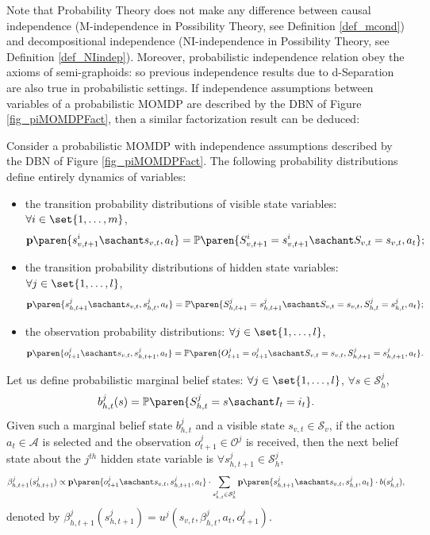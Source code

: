 Note that Probability Theory does not make any difference between 
causal independence (M-independence in Possibility Theory, see Definition \ref{def_mcond}) 
and decompositional independence (NI-independence in Possibility Theory, see Definition \ref{def_NIindep}).
Moreover, probabilistic independence relation obey the axioms of semi-graphoids:
so previous independence results due to d-Separation are also true in probabilistic settings. 
If independence assumptions between variables of a probabilistic MOMDP \cite{OngShaoHsuWee-IJRR10,AraThoBufCha-ICTAI10} are described 
by the DBN of Figure \ref{fig_piMOMDPFact},
then a similar factorization result can be deduced:
\begin{theorem}
\label{thm_factoredPROBbelief}
Consider a probabilistic MOMDP with independence assumptions described by the DBN of Figure \ref{fig_piMOMDPFact}.
The following probability distributions define entirely dynamics of variables:
\begin{itemize}
\item the transition probability distributions of visible state variables: 
$\forall i \in \set{1,\ldots,m}$, 
\[ \textbf{p} \paren{ s^i_{v,t+1} \sachant s_{v,t}, a_t } = \mathbb{P} \paren{ S^i_{v,t+1} = s^i_{v,t+1} \sachant S_{v,t} = s_{v,t}, a_t  }; \]	
\item the transition probability distributions of hidden state variables:
$\forall j \in \set{1,\ldots,l}$,
\[ \textbf{p} \paren{ s^j_{h,t+1} \sachant s_{v,t}, s^j_{h,t}, a_t } = \mathbb{P} \paren{ S^j_{h,t+1} = s^j_{h,t+1} \sachant S_{v,t} = s_{v,t}, S^j_{h,t} =  s^j_{h,t}, a_t  }; \]
\item the observation probability distributions:
$\forall j \in \set{1,\ldots,l}$,
\[ \textbf{p} \paren{ o^j_{t+1} \sachant s_{v,t}, s^j_{h,t+1}, a_t } = \mathbb{P} \paren{ O^j_{t+1} = o^j_{t+1} \sachant S_{v,t} = s_{v,t}, S^j_{h,t+1} =  s^j_{h,t+1}, a_t  }. \]
\end{itemize}
Let us define probabilistic marginal belief states:
$\forall j \in \set{1,\ldots,l}$, $\forall s \in \mathcal{S}^j_h$, 
\[ b^j_{h,t}(s) = \mathbb{P} \paren{ S^j_{h,t} = s \sachant I_t = i_t}.\]
Given such a marginal belief state $b^j_{h,t}$
and a visible state $s_{v,t} \in \mathcal{S}_v$, 
if the action $a_t \in \mathcal{A}$ is selected
and the observation $o^j_{t+1} \in \mathcal{O}^j$
is received, 
then the next belief state about the $j^{th}$ hidden state variable is
$\forall s^j_{h,t+1} \in \mathcal{S}^j_h$, 
\[ \beta^j_{h,t+1}(s^j_{h,t+1}) \propto \textbf{p} \paren{ o^j_{t+1} \sachant s_{v,t}, s^j_{h,t+1}, a_t } \cdot 
\sum_{s^j_{h,t} \in \mathcal{S}_h^j} \textbf{p} \paren{ s^j_{h,t+1} \sachant s_{v,t}, s^j_{h,t}, a_t } \cdot b(s^j_{h,t}), \]
denoted by $\beta^j_{h,t+1}(s^j_{h,t+1}) = u^j(s_{v,t},\beta^j_{h,t},a_t,o^j_{t+1})$.


\end{theorem}
